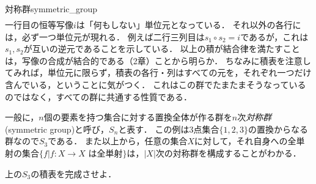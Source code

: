 \documentclass[11pt,a4paper, dvipdfmx]{jsarticle}
\begin{document}
\begin{rei}{対称群}{symmetric_group}
\[\begin{array}{c|cccccc}
        \end{array}
    \]
    一行目の恒等写像$i$は「何もしない」単位元となっている．
    それ以外の各行には，必ず一つ単位元が現れる．
    例えば二行三列目は$s_1 \circ s_2 = i$であるが，これは$s_1, s_2$が互いの逆元であることを示している．
    以上の積が結合律を満たすことは，写像の合成が結合的である（2章）ことから明らか．
    ちなみに積表を注意してみれば，単位元に限らず，積表の各行・列はすべての元を，それぞれ一つだけ含んでいる，ということに気がつく．
    これはこの群でたまたまそうなっているのではなく，すべての群に共通する性質である．

    一般に，$n$個の要素を持つ集合に対する置換全体が作る群を$n$次\emph{対称群}(symmetric group)と呼び，$S_n$と表す．
    この例は3点集合$\{1, 2, 3\}$の置換からなる群なので$S_3$である．
    また以上から，任意の集合$X$に対して，それ自身への全単射の集合$\{f | f:X \to X \text{ は全単射} \}$は，$|X|$次の対称群を構成することがわかる．
\end{rei}

\begin{renshu}{}{}
    上の$S_3$の積表を完成させよ．
\end{renshu}
\end{document}
